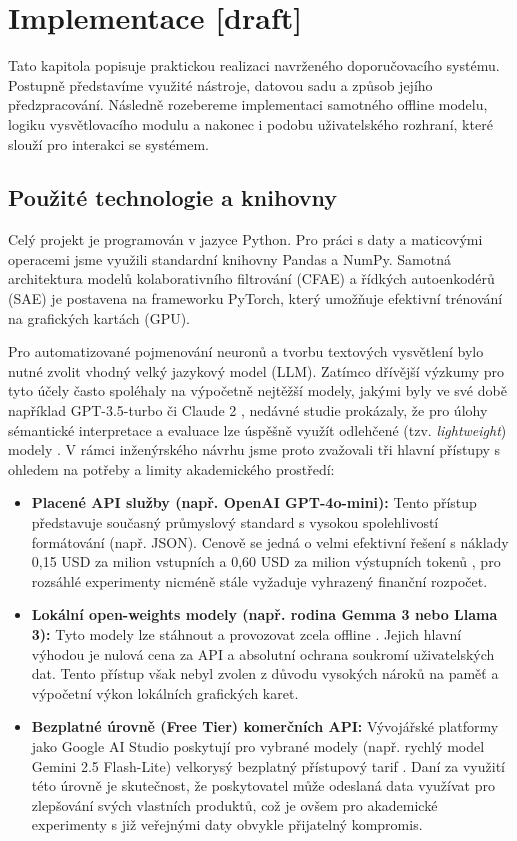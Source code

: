 \chapter{Implementace [draft]}
\label{chap:implementace}

Tato kapitola popisuje praktickou realizaci navrženého doporučovacího systému. Postupně představíme využité nástroje, datovou sadu a způsob jejího předzpracování. Následně rozebereme implementaci samotného offline modelu, logiku vysvětlovacího modulu a nakonec i podobu uživatelského rozhraní, které slouží pro interakci se systémem.

\section{Použité technologie a knihovny}
\label{sec:technologie}

Celý projekt je programován v jazyce Python. Pro práci s daty a maticovými operacemi jsme využili standardní knihovny Pandas a NumPy. Samotná architektura modelů kolaborativního filtrování (CFAE) a řídkých autoenkodérů (SAE) je postavena na frameworku PyTorch, který umožňuje efektivní trénování na grafických kartách (GPU).

Pro automatizované pojmenování neuronů a tvorbu textových vysvětlení bylo nutné zvolit vhodný velký jazykový model (LLM). Zatímco dřívější výzkumy pro tyto účely často spoléhaly na výpočetně nejtěžší modely, jakými byly ve své době například GPT-3.5-turbo či Claude 2 \cite{Zeng2025}, nedávné studie prokázaly, že pro úlohy sémantické interpretace a evaluace lze úspěšně využít odlehčené (tzv. \textit{lightweight}) modely \cite{ONeill2024, Thelwall2026}. V rámci inženýrského návrhu jsme proto zvažovali tři hlavní přístupy s ohledem na potřeby a limity akademického prostředí:

\begin{itemize}
    \item \textbf{Placené API služby (např. OpenAI GPT-4o-mini):} Tento přístup představuje současný průmyslový standard s vysokou spolehlivostí formátování (např. JSON). Cenově se jedná o velmi efektivní řešení s náklady 0,15 USD za milion vstupních a 0,60 USD za milion výstupních tokenů \cite{LLMStats2026}, pro rozsáhlé experimenty nicméně stále vyžaduje vyhrazený finanční rozpočet.
    \item \textbf{Lokální open-weights modely (např. rodina Gemma 3 nebo Llama 3):} Tyto modely lze stáhnout a provozovat zcela offline \cite{GooglePricing2026, Thelwall2026}. Jejich hlavní výhodou je nulová cena za API a absolutní ochrana soukromí uživatelských dat. Tento přístup však nebyl zvolen z důvodu vysokých nároků na paměť a výpočetní výkon lokálních grafických karet.
    \item \textbf{Bezplatné úrovně (Free Tier) komerčních API:} Vývojářské platformy jako Google AI Studio poskytují pro vybrané modely (např. rychlý model Gemini 2.5 Flash-Lite) velkorysý bezplatný přístupový tarif \cite{GooglePricing2026}. Daní za využití této úrovně je skutečnost, že poskytovatel může odeslaná data využívat pro zlepšování svých vlastních produktů, což je ovšem pro akademické experimenty s již veřejnými daty obvykle přijatelný kompromis.
\end{itemize}

